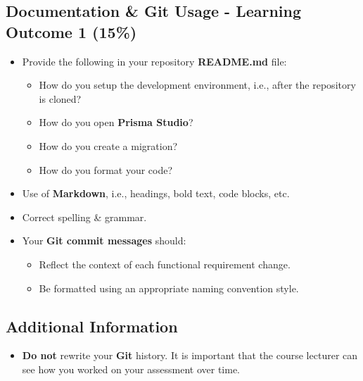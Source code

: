 \documentclass{article}
\begin{document}
\subsection*{Documentation \& Git Usage - Learning Outcome 1 (15\%)}
\begin{itemize}
    \item Provide the following in your repository \textbf{README.md} file:
    \begin{itemize} 
      \item How do you setup the development environment, i.e., after the repository is cloned?
	  \item How do you open \textbf{Prisma Studio}?
	  \item How do you create a migration? 
	  \item How do you format your code?
    \end{itemize}
    \item Use of \textbf{Markdown}, i.e., headings, bold text, code blocks, etc.
    \item Correct spelling \& grammar.
    \item Your \textbf{Git commit messages} should:
    \begin{itemize}
      \item Reflect the context of each functional requirement change.
      \item Be formatted using an appropriate naming convention style.
    \end{itemize}	
\end{itemize}

\subsection*{Additional Information}
\begin{itemize}
    \item \textbf{Do not} rewrite your \textbf{Git} history. It is important that the course lecturer can see how you worked on your assessment over time. 
\end{itemize} 
\end{document}
